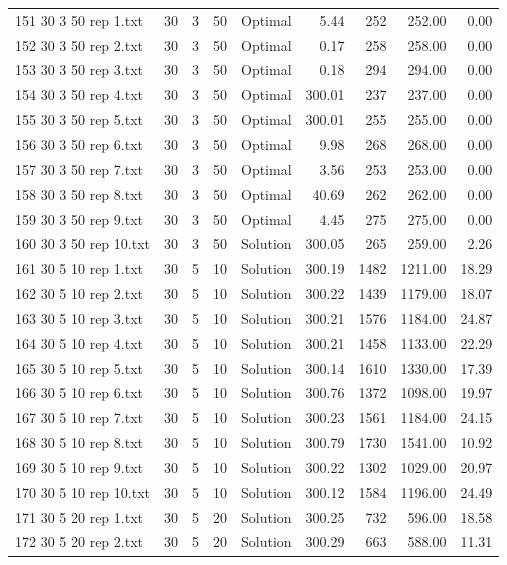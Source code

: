 \begin{longtable}{lrrllrrrr}
151 30 3 50 rep 1.txt & 30 & 3 & 50 & Optimal &  5.44 & 252 & 252.00 &  0.00\\
152 30 3 50 rep 2.txt & 30 & 3 & 50 & Optimal &  0.17 & 258 & 258.00 &  0.00\\
153 30 3 50 rep 3.txt & 30 & 3 & 50 & Optimal &  0.18 & 294 & 294.00 &  0.00\\
154 30 3 50 rep 4.txt & 30 & 3 & 50 & Optimal & 300.01 & 237 & 237.00 &  0.00\\
155 30 3 50 rep 5.txt & 30 & 3 & 50 & Optimal & 300.01 & 255 & 255.00 &  0.00\\
156 30 3 50 rep 6.txt & 30 & 3 & 50 & Optimal &  9.98 & 268 & 268.00 &  0.00\\
157 30 3 50 rep 7.txt & 30 & 3 & 50 & Optimal &  3.56 & 253 & 253.00 &  0.00\\
158 30 3 50 rep 8.txt & 30 & 3 & 50 & Optimal & 40.69 & 262 & 262.00 &  0.00\\
159 30 3 50 rep 9.txt & 30 & 3 & 50 & Optimal &  4.45 & 275 & 275.00 &  0.00\\
160 30 3 50 rep 10.txt & 30 & 3 & 50 & Solution & 300.05 & 265 & 259.00 &  2.26\\
161 30 5 10 rep 1.txt & 30 & 5 & 10 & Solution & 300.19 & 1482 & 1211.00 & 18.29\\
162 30 5 10 rep 2.txt & 30 & 5 & 10 & Solution & 300.22 & 1439 & 1179.00 & 18.07\\
163 30 5 10 rep 3.txt & 30 & 5 & 10 & Solution & 300.21 & 1576 & 1184.00 & 24.87\\
164 30 5 10 rep 4.txt & 30 & 5 & 10 & Solution & 300.21 & 1458 & 1133.00 & 22.29\\
165 30 5 10 rep 5.txt & 30 & 5 & 10 & Solution & 300.14 & 1610 & 1330.00 & 17.39\\
166 30 5 10 rep 6.txt & 30 & 5 & 10 & Solution & 300.76 & 1372 & 1098.00 & 19.97\\
167 30 5 10 rep 7.txt & 30 & 5 & 10 & Solution & 300.23 & 1561 & 1184.00 & 24.15\\
168 30 5 10 rep 8.txt & 30 & 5 & 10 & Solution & 300.79 & 1730 & 1541.00 & 10.92\\
169 30 5 10 rep 9.txt & 30 & 5 & 10 & Solution & 300.22 & 1302 & 1029.00 & 20.97\\
170 30 5 10 rep 10.txt & 30 & 5 & 10 & Solution & 300.12 & 1584 & 1196.00 & 24.49\\
171 30 5 20 rep 1.txt & 30 & 5 & 20 & Solution & 300.25 & 732 & 596.00 & 18.58\\
172 30 5 20 rep 2.txt & 30 & 5 & 20 & Solution & 300.29 & 663 & 588.00 & 11.31\\

\end{longtable}
